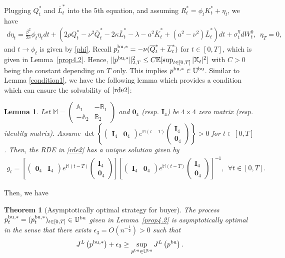 \documentclass[11pt]{article}
\newtheorem{theorem}{Theorem}[section]
\newtheorem{lemma}{Lemma}[section]
\numberwithin{equation}{section}
\begin{document}
Plugging $Q_t^*$ and $\overline{L}_t^*$ into the 5th equation, and assuming $R_t^*=\phi_tK_t^*+\eta_t$, we have 
\begin{align*}
d\eta_t=\frac{\beta^2}{2c}\phi_t\eta_tdt+(2\rho Q_t^*-\nu^2\overline{Q}_t^*-2\kappa \overline{L}_t^*-\lambda-a^2\overline{K}_t^*+(a^2-\nu^2)\overline{L}_t^*)dt+\sigma_t^{\eta}dW_t^0,~~ \eta_T=0,
\end{align*}
and $t\to\phi_t$ is given by \eqref{phi}. Recall $p_t^{{\rm bu},*}=-\nu (\overline{Q}_t^*+\overline{L}_t^*)$ for $t\in[0,T]$, which is given in Lemma~\ref{prop4.2}. Hence, $\Vert p^{{\rm bu},*}\Vert_{2, T}^2\leq C\mathbb{E}[\sup_{t\in [0 ,T]}|\mathbb{X}_t|^2]$ with $C>0$ being the constant depending on $T$ only. This implies $p^{{\rm bu},*}\in \mathbb{U}^{{\rm bu}}$.
Similar to Lemma \ref{condition1}, we have the following lemma which provides a condition which can ensure the solvability of $\eqref{rde2}$:
\begin{lemma}\label{condition2}
Let $\mathbb{M}=\begin{pmatrix}
\mathbb{A}_1& -\mathbb{B}_1\\
-\mathbb{A}_2	&\mathbb{B}_2 
\end{pmatrix}$ and $\boldsymbol{0}_4$ (resp. $\mathbf{I}_4$) be $4 \times 4$ zero matrix (resp. identity matrix). Assume $\det \left\{ \begin{pmatrix}\mathbf{I}_4& \boldsymbol{0}_4   \end{pmatrix} e^{\mathbb{M}(t-T)} \begin{pmatrix}  \mathbf{I}_4\\\boldsymbol{0}_4\end{pmatrix} \right\} > 0$ for $t \in [0, T]$. Then, the RDE in \eqref{rde2} has a unique solution given by
\begin{align*}
g_t = \left[ \begin{pmatrix} \boldsymbol{0}_4 & \mathbf{I}_4 \end{pmatrix} e^{\mathbb{M}(t-T)} \begin{pmatrix}   \mathbf{I}_4\\ \boldsymbol{0}_4 \end{pmatrix} \right] \left[ \begin{pmatrix}\mathbf{I}_4 &\boldsymbol{0}_4   \end{pmatrix} e^{\mathbb{M}(t-T)} \begin{pmatrix} \mathbf{I}_4 \\ \boldsymbol{0}_4 \end{pmatrix} \right]^{-1},~~\forall t\in[0,T].
\end{align*}
\end{lemma}
Then, we have
\begin{theorem}[Asymptotically optimal strategy for buyer]\label{thm:pubustar}
The process $p_t^{{\rm bu},*}=(p_t^{{\rm bu},*})_{t\in[0,T]}\in \mathbb{U}^{\rm bu}$ given in Lemma~\ref{prop4.2} is  asymptotically optimal in the sense that
there exists $\epsilon_3=O(n^{-\frac{1}{2}})>0$ such that 
\begin{align*}
J^L\left(p^{{\rm bu},*}\right)+\epsilon_3\geq \sup_{p^{{\rm bu}}\in\mathbb{U}^{\rm bu}}J^L\left(p^{{\rm bu}}\right).
\end{align*}
\end{theorem}
\end{document}

